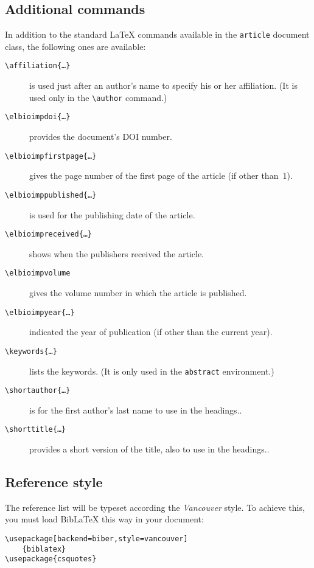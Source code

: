 \documentclass[UKenglish]{elbioimp2}
\newcommand{\lacmd}[1]{\p{\textbackslash #1}}
\newcommand{\lacmdx}[1]{\lacmd{#1\{\dots\}}}
\newcommand{\p}[1]{\texttt{#1}}
\begin{document}
\subsection{Additional commands}
In addition to the standard \LaTeX{} commands available in the
\p{article} document class, the following ones are available:
\begin{description}
\item[\lacmdx{affiliation}] is used just after an author's name to
  specify his or her affiliation. (It is used only in the
  \lacmd{author} command.) 

\item[\lacmdx{elbioimpdoi}] provides the document's DOI
  number.

\item[\lacmdx{elbioimpfirstpage}] gives the page number of the first
  page of the article (if other than~1).

\item[\lacmdx{elbioimppublished}] is used for the publishing date of
  the article.

\item[\lacmdx{elbioimpreceived}] shows when the publishers received
  the article.

\item[\lacmd{elbioimpvolume}] gives the volume number in which the
  article is published.
  
\item[\lacmdx{elbioimpyear}] indicated the year of publication (if
  other than the current year).

\item[\lacmdx{keywords}] lists the keywords. (It is only used in the
  \p{abstract} environment.)

\item[\lacmdx{shortauthor}] is for the first author's last name to use
  in the headings..

\item[\lacmdx{shorttitle}] provides a short version of the title, also
  to use in the headings..
\end{description}

\subsection{Reference style}
The reference list will be typeset according the \emph{Vancouver}
style.\cite{biomed-req} To achieve this, you must load Bib\LaTeX{}
this way in your document:

\begin{verbatim}
\usepackage[backend=biber,style=vancouver]
    {biblatex}
\usepackage{csquotes}

\end{verbatim}

\printbibliography
\end{document}
